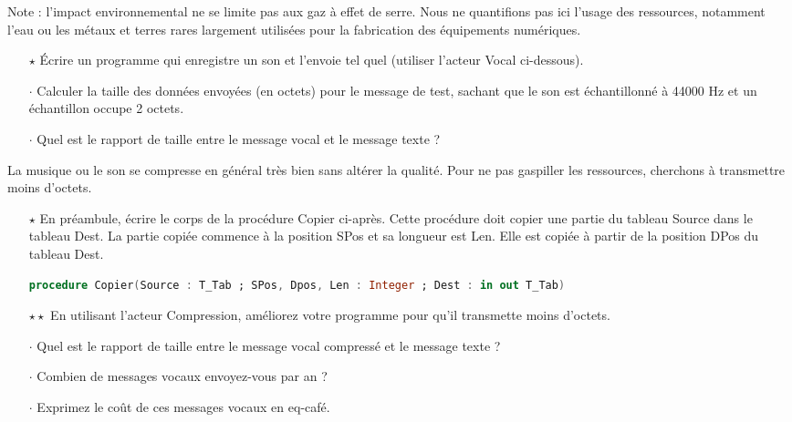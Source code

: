 \medskip

Note : l'impact environnemental ne se limite pas aux gaz à effet de serre. Nous ne quantifions pas ici l'usage des ressources, notamment l'eau ou les métaux et terres rares largement utilisées pour la fabrication des équipements numériques.


\begin{itemize}
\item[$\star$] Écrire un programme qui enregistre un son et l'envoie tel quel (utiliser l'acteur Vocal ci-dessous).
\item[$\cdot$] Calculer la taille des données envoyées (en octets) pour le message de test, sachant que le son est échantillonné à 44000 Hz et un échantillon occupe 2 octets.
\item[$\cdot$] Quel est le rapport de taille entre le message vocal et le message texte ?
\end{itemize}



La musique ou le son se compresse en général très bien sans altérer la qualité.
Pour ne pas gaspiller les ressources, cherchons à transmettre moins d'octets.

\begin{itemize}
\item[$\star$] En préambule, écrire le corps de la procédure Copier ci-après. Cette procédure doit copier une partie du tableau Source dans le tableau Dest.
  La partie copiée commence à la position SPos et sa longueur est Len. Elle est copiée à partir de la position DPos du tableau Dest.

  \begin{lstlisting}[language=Ada]
    procedure Copier(Source : T_Tab ; SPos, Dpos, Len : Integer ; Dest : in out T_Tab) 
  \end{lstlisting}
  
  \item[$\star\star$] En utilisant l'acteur Compression, améliorez votre programme pour qu'il transmette moins d'octets.
\end{itemize}

\begin{itemize}
\item[$\cdot$] Quel est le rapport de taille entre le message vocal compressé et le message texte ?
\item[$\cdot$] Combien de messages vocaux envoyez-vous par an ?
\item[$\cdot$] Exprimez le coût de ces messages vocaux en eq-café.
\end{itemize}

